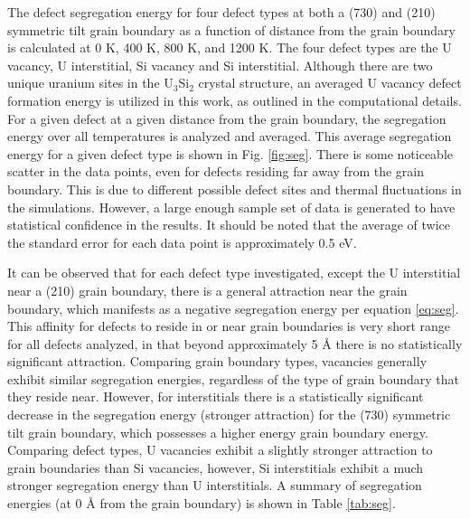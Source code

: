 \documentclass[review]{elsarticle}
\begin{document}
The defect segregation energy for four defect types at both a (730) and (210) symmetric tilt grain boundary as a function of distance from the grain boundary is calculated at 0 K, 400 K, 800 K, and 1200 K. The four defect types are the U vacancy, U interstitial, Si vacancy and Si interstitial. Although there are two unique uranium sites in the U$_{3}$Si$_{2}$ crystal structure, an averaged U vacancy defect formation energy is utilized in this work, as outlined in the computational details. For a given defect at a given distance from the grain boundary, the segregation energy over all temperatures is analyzed and averaged. This average segregation energy for a given defect type is shown in Fig. \ref{fig:seg}. There is some noticeable scatter in the data points, even for defects residing far away from the grain boundary. This is due to different possible defect sites and thermal fluctuations in the simulations. However, a large enough sample set of data is generated to have statistical confidence in the results. It should be noted that the average of twice the standard error for each data point is approximately 0.5 eV. 

It can be observed that for each defect type investigated, except the U interstitial near a (210) grain boundary, there is a general attraction near the grain boundary, which manifests as a negative segregation energy per equation \ref{eq:seg}. This affinity for defects to reside in or near grain boundaries is very short range for all defects analyzed, in that beyond approximately 5 {\AA} there is no statistically significant attraction. Comparing grain boundary types, vacancies generally exhibit similar segregation energies, regardless of the type of grain boundary that they reside near. However, for interstitials there is a statistically significant decrease in the segregation energy (stronger attraction) for the (730) symmetric tilt grain boundary, which possesses a higher energy grain boundary energy. Comparing defect types, U vacancies exhibit a slightly stronger attraction to grain boundaries than Si vacancies, however, Si interstitials exhibit a much stronger segregation energy than U interstitials. A summary of segregation energies (at 0 {\AA} from the grain boundary) is shown in Table \ref{tab:seg}. 
 
\end{document}
